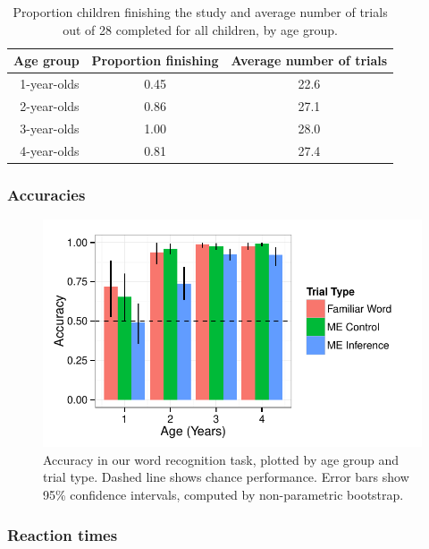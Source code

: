 \documentclass[man,noapacite]{apa2}
\begin{document}
\begin{table}[t]
\centering
\caption{Proportion children finishing the study and average number of trials out of 28 completed for all children, by age group.\label{tab:completion}}

\begin{tabular}{rcc}
  \hline
Age group & Proportion finishing & Average number of trials \\ 
  \hline
1-year-olds & 0.45 & 22.6 \\ 
2-year-olds & 0.86 & 27.1 \\ 
3-year-olds & 1.00 & 28.0 \\ 
4-year-olds & 0.81 & 27.4 \\ 
   \hline
\end{tabular}
\end{table}

\subsubsection{Accuracies}


\begin{figure}[t] 
  \begin{center} 
    \includegraphics[width=5in]{figures/accuracy.pdf} 
    \caption{\label{fig:accuracy} Accuracy in our word recognition task, plotted by age group and trial type. Dashed line shows chance performance. Error bars show 95\% confidence intervals, computed by non-parametric bootstrap. }
  \end{center} 
\end{figure}

\subsubsection{Reaction times}
\end{document}
